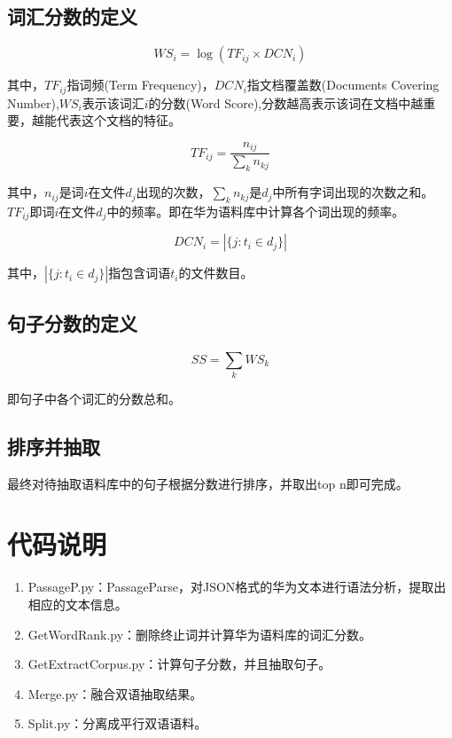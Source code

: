 \documentclass{ctexart}
\begin{document}
\subsection{词汇分数的定义}

    \begin{equation}
        WS_i = \log (TF_{ij} \times   DCN_i)
    \end{equation}

其中，$TF_{ij}$指词频(Term Frequency)，$DCN_{i}$指文档覆盖数(Documents Covering Number),$WS_i$表示该词汇$i$的分数(Word Score),分数越高表示该词在文档中越重要，越能代表这个文档的特征。

\begin{equation}
    TF_{ij}=\frac{n_{ij}}{\sum_k{n_{kj}}}
\end{equation}

其中，$n_{ij}$是词$i$在文件$d_j$出现的次数，$\sum_k{n_{kj}}$是$d_j$中所有字词出现的次数之和。$TF_{ij}$即词$i$在文件$d_j$中的频率。即在华为语料库中计算各个词出现的频率。

\begin{equation}
    DCN_{i}=|\{j:t_i\in d_j \}|
\end{equation}

其中，$|\{j:t_i\in d_j \}|$指包含词语$t_i$的文件数目。

\subsection{句子分数的定义}

\begin{equation}
    SS=\sum_k WS_k
\end{equation}

    即句子中各个词汇的分数总和。

\subsection{排序并抽取}
最终对待抽取语料库中的句子根据分数进行排序，并取出top n即可完成。
\section{代码说明}

\begin{enumerate}
    \item PassageP.py：PassageParse，对JSON格式的华为文本进行语法分析，提取出相应的文本信息。 
    \item GetWordRank.py：删除终止词并计算华为语料库的词汇分数。
    \item GetExtractCorpus.py：计算句子分数，并且抽取句子。
    \item Merge.py：融合双语抽取结果。
    \item Split.py：分离成平行双语语料。
\end{enumerate}
\end{document}

